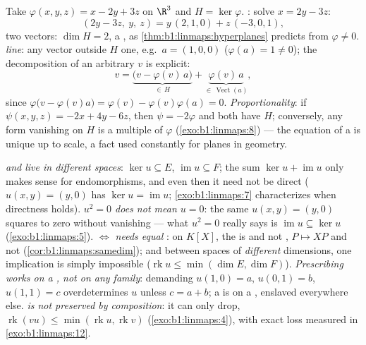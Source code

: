 \begin{example}
\label{ex:b1:linmaps:hyperplanerun}
Take $\varphi(x, y, z) = x - 2y + 3z$ on $\R^3$ and $H =
\ker\varphi$. \emph{}: solve $x = 2y - 3z$:
\[
(2y - 3z,\ y,\ z) = y\,(2, 1, 0) + z\,(-3, 0, 1),
\]
two  vectors: $\dim H = 2$, a , as
\cref{thm:b1:linmaps:hyperplanes} predicts from $\varphi \neq
0$. \emph{ line}: any vector outside $H$  one,
e.g.\ $a = (1, 0, 0)$ ($\varphi(a) = 1 \neq 0$); the
decomposition of an arbitrary $v$ is explicit:
\[
v = \underbrace{\bigl(v - \varphi(v)\,a\bigr)}_{\in\,H}
+ \underbrace{\varphi(v)\,a}_{\in\,\operatorname{Vect}(a)},
\]
since $\varphi\bigl(v - \varphi(v)a\bigr) = \varphi(v) -
\varphi(v)\varphi(a) = 0$. \emph{Proportionality}: if $\psi(x,y,z)
= -2x + 4y - 6z$, then $\psi = -2\varphi$ and both have 
$H$; conversely, any form vanishing on $H$ is a multiple of
$\varphi$ (\cref{exo:b1:linmaps:8}) --- the equation of a
 is unique up to scale, a fact used constantly for
planes in geometry.
\end{example}

\begin{remark}
\label{rem:b1:linmaps:pitfalls}
\emph{ and  live in different spaces}: $\ker u
\subseteq E$, $\operatorname{im} u \subseteq F$; the sum $\ker u
+ \operatorname{im} u$ only makes sense for endomorphisms, and
even then it need not be direct ($u(x, y) = (y, 0)$ has $\ker u
= \operatorname{im} u$; \cref{exo:b1:linmaps:7} characterizes
when directness holds).
\emph{$u^2 = 0$ does not mean $u = 0$}: the same $u(x,y) =
(y, 0)$ squares to zero without vanishing --- what $u^2 = 0$
really says is $\operatorname{im} u \subseteq \ker u$
(\cref{exo:b1:linmaps:5}).
\emph{ $\iff$  needs equal }: on $K[X]$, the  is  and not
, $P \mapsto XP$  and not 
(\cref{cor:b1:linmaps:samedim}); and between spaces of
\emph{different} dimensions, one implication is simply
impossible ($\operatorname{rk} u \leq \min(\dim E, \dim F)$).
\emph{Prescribing  works on a , not on any family}:
demanding $u(1, 0) = a$, $u(0, 1) = b$, $u(1, 1) = c$
overdetermines $u$ unless $c = a + b$; a  is  on a
, enslaved everywhere else.
\emph{ is not preserved by composition}: it can only drop,
$\operatorname{rk}(vu) \leq \min(\operatorname{rk} u,
\operatorname{rk} v)$ (\cref{exo:b1:linmaps:4}), with exact loss
measured in \cref{exo:b1:linmaps:12}.
\end{remark}

